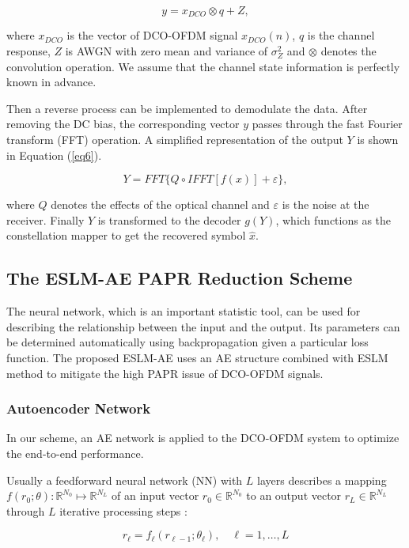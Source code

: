 \documentclass[conference]{IEEEtran}
\begin{document}
\begin{equation}
y = x_{DCO} \otimes q + Z,
\label{eq5}
\end{equation}

where $x_{DCO}$ is the vector of DCO-OFDM signal $x_{DCO}(n)$, $q$ is the channel response, $Z$ is AWGN with zero mean and variance of $\sigma_Z^2$ and $\otimes$ denotes the convolution operation. We assume that the channel state information is perfectly known in advance.

Then a reverse process can be implemented to demodulate the data. After removing the DC bias, the corresponding vector $y$ passes through the fast Fourier transform (FFT) operation. A simplified representation of the output $Y$ is shown in Equation (\ref{eq6}).

\begin{equation}
Y = FFT\{Q \circ IFFT[f(x)] + \varepsilon\},
\label{eq6}
\end{equation}

where $Q$ denotes the effects of the optical channel and $\varepsilon$ is the noise at the receiver. Finally $Y$ is transformed to the decoder $g(Y)$, which functions as the constellation mapper to get the recovered symbol $\hat{x}$.

\subsection{The ESLM-AE PAPR Reduction Scheme}
The neural network, which is an important statistic tool, can be used for describing the relationship between the input and the output. Its parameters can be determined automatically using backpropagation given a particular loss function. The proposed ESLM-AE uses an AE structure combined with ESLM method to mitigate the high PAPR issue of DCO-OFDM signals.

\subsubsection{Autoencoder Network}
In our scheme, an AE network is applied to the DCO-OFDM system to optimize the end-to-end performance.

Usually a feedforward neural network (NN) with $L$ layers describes a mapping $f(r_0; \theta) : \mathbb{R}^{N_0} \mapsto \mathbb{R}^{N_L}$ of an input vector $r_0 \in \mathbb{R}^{N_0}$ to an output vector $r_L \in \mathbb{R}^{N_L}$ through $L$ iterative processing steps \cite{b33}:

\begin{equation}
r_\ell = f_\ell(r_{\ell-1}; \theta_\ell), \quad \ell = 1, \dots , L
\label{eq7}
\end{equation}
\end{document}
